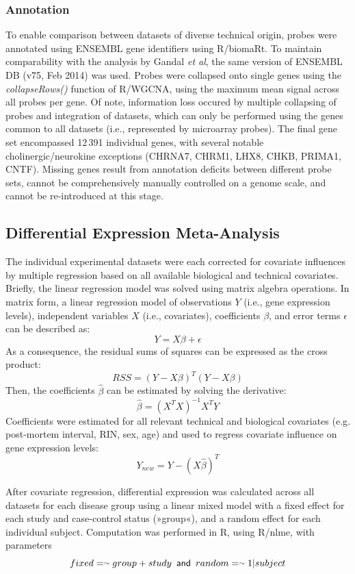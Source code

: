 \begin{method}
\subsubsection{Annotation}
To enable comparison between datasets of diverse technical origin, probes were annotated using ENSEMBL gene identifiers using R/biomaRt\cite{Durinck2009}. To maintain comparability with the analysis by Gandal \emph{et al}\cite{Gandal2018}, the same version of ENSEMBL DB (v75, Feb 2014) was used. Probes were collapsed onto single genes using the \emph{collapseRows()} function of R/WGCNA\cite{Langfelder2008}, using the maximum mean signal across all probes per gene. Of note, information loss occured by multiple collapsing of probes and integration of datasets, which can only be performed using the genes common to all datasets (i.e., represented by microarray probes). The final gene set encompassed 12\,391 individual genes, with several notable cholinergic/neurokine exceptions (CHRNA7, CHRM1, LHX8, CHKB, PRIMA1, CNTF). Missing genes result from annotation deficits between different probe sets, cannot be comprehensively manually controlled on a genome scale, and cannot be re-introduced at this stage. 

\subsection{Differential Expression Meta-Analysis}
The individual experimental datasets were each corrected for covariate influences by multiple regression based on all available biological and technical covariates. Briefly, the linear regression model was solved using matrix algebra operations. In matrix form, a linear regression model of observations $Y$ (i.e., gene expression levels), independent variables $X$ (i.e., covariates), coefficients $\beta$, and error terms $\epsilon$ can be described as: $$Y = X\beta + \epsilon$$ As a consequence, the residual sums of squares can be expressed as the cross product: $$RSS = (Y - X\beta)^T(Y - X\beta)$$ Then, the coefficients $\hat{\beta}$ can be estimated by solving the derivative: $$\hat{\beta} = (X^TX)^{-1} X^TY$$ Coefficients were estimated for all relevant technical and biological covariates (e.g. post-mortem interval, RIN, sex, age) and used to regress covariate influence on gene expression levels: $$Y_{new} = Y - (X\hat{\beta})^T$$

After covariate regression, differential expression was calculated across all datasets for each disease group using a linear mixed model with a fixed effect for each study and case-control status (»group«), and a random effect for each individual subject. Computation was performed in R, using R/nlme\cite{Pinheiro2019}, with parameters $$fixed = \smallsim group + study\textrm{\sffamily\,\,\,and\,\,\,}random = \smallsim 1|subject$$


\end{method}
